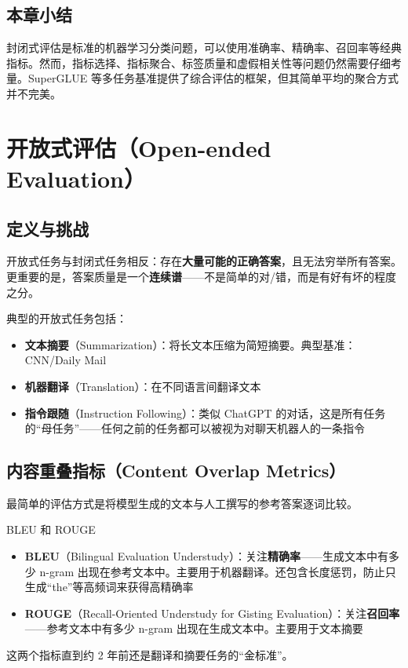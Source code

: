 \documentclass[a4paper]{article}
\begin{document}
\subsection{本章小结}

封闭式评估是标准的机器学习分类问题，可以使用准确率、精确率、召回率等经典指标。然而，指标选择、指标聚合、标签质量和虚假相关性等问题仍然需要仔细考量。SuperGLUE 等多任务基准提供了综合评估的框架，但其简单平均的聚合方式并不完美。


\section{开放式评估（Open-ended Evaluation）}

\subsection{定义与挑战}

开放式任务与封闭式任务相反：存在\textbf{大量可能的正确答案}，且无法穷举所有答案。更重要的是，答案质量是一个\textbf{连续谱}——不是简单的对/错，而是有好有坏的程度之分。

典型的开放式任务包括：
\begin{itemize}
    \item \textbf{文本摘要}（Summarization）：将长文本压缩为简短摘要。典型基准：CNN/Daily Mail
    \item \textbf{机器翻译}（Translation）：在不同语言间翻译文本
    \item \textbf{指令跟随}（Instruction Following）：类似 ChatGPT 的对话，这是所有任务的``母任务''——任何之前的任务都可以被视为对聊天机器人的一条指令
\end{itemize}




\subsection{内容重叠指标（Content Overlap Metrics）}

最简单的评估方式是将模型生成的文本与人工撰写的参考答案逐词比较。

\begin{importantbox}{BLEU 和 ROUGE}
\begin{itemize}
    \item \textbf{BLEU}（Bilingual Evaluation Understudy）：关注\textbf{精确率}——生成文本中有多少 n-gram 出现在参考文本中。主要用于机器翻译。还包含长度惩罚，防止只生成``the''等高频词来获得高精确率
    \item \textbf{ROUGE}（Recall-Oriented Understudy for Gisting Evaluation）：关注\textbf{召回率}——参考文本中有多少 n-gram 出现在生成文本中。主要用于文本摘要
\end{itemize}
这两个指标直到约 2 年前还是翻译和摘要任务的``金标准''。
\end{importantbox}
\end{document}
